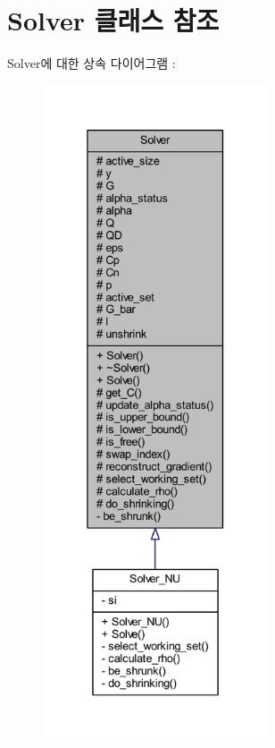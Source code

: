 \hypertarget{class_solver}{\section{Solver 클래스 참조}
\label{class_solver}
}


Solver에 대한 상속 다이어그램 \+: 
\nopagebreak
\begin{figure}[H]
\begin{center}
\leavevmode
\includegraphics[height=550pt]{class_solver__inherit__graph}
\end{center}
\end{figure}


